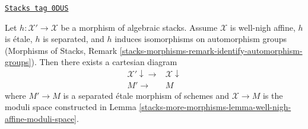 \begin{lemma}
\label{stacks-more-morphisms-lemma-etale-separated-over-well-nigh-affine}
\href{https://stacks.math.columbia.edu/tag/0DUS}{\texttt{Stacks tag 0DUS}}

Let $h : \mathcal{X}' \to \mathcal{X}$ be a morphism of algebraic stacks.
Assume $\mathcal{X}$ is well-nigh affine, $h$ is \'etale, $h$ is separated,
and $h$ induces isomorphisms on automorphism groups
(Morphisms of Stacks, Remark
\ref{stacks-morphisms-remark-identify-automorphism-groups}).
Then there exists a cartesian diagram
$$
\begin{array}{cc}\mathcal{X}' \downarrow\longrightarrow & \mathcal{X} \downarrow \\ M' \longrightarrow & M\end{array}
$$
where $M' \to M$ is a separated \'etale morphism of schemes and
$\mathcal{X} \to M$ is the moduli space constructed in
Lemma \ref{stacks-more-morphisms-lemma-well-nigh-affine-moduli-space}.
\end{lemma}

